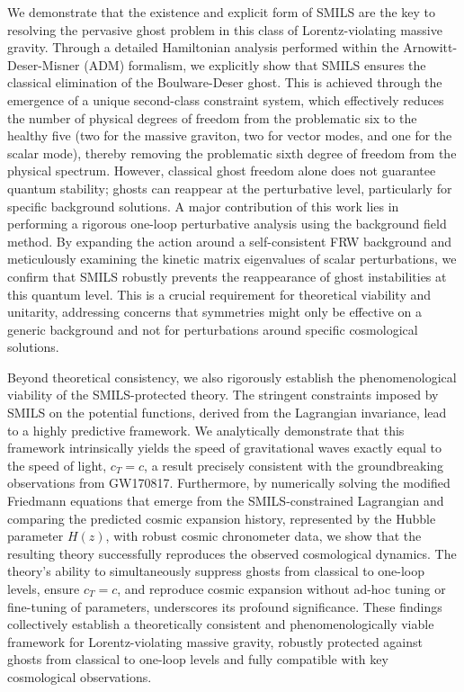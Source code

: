 \documentclass[twocolumn]{aastex631}
\begin{document}
We demonstrate that the existence and explicit form of SMILS are the key to resolving the pervasive ghost problem in this class of Lorentz-violating massive gravity. Through a detailed Hamiltonian analysis performed within the Arnowitt-Deser-Misner (ADM) formalism, we explicitly show that SMILS ensures the classical elimination of the Boulware-Deser ghost. This is achieved through the emergence of a unique second-class constraint system, which effectively reduces the number of physical degrees of freedom from the problematic six to the healthy five (two for the massive graviton, two for vector modes, and one for the scalar mode), thereby removing the problematic sixth degree of freedom from the physical spectrum. However, classical ghost freedom alone does not guarantee quantum stability; ghosts can reappear at the perturbative level, particularly for specific background solutions. A major contribution of this work lies in performing a rigorous one-loop perturbative analysis using the background field method. By expanding the action around a self-consistent FRW background and meticulously examining the kinetic matrix eigenvalues of scalar perturbations, we confirm that SMILS robustly prevents the reappearance of ghost instabilities at this quantum level. This is a crucial requirement for theoretical viability and unitarity, addressing concerns that symmetries might only be effective on a generic background and not for perturbations around specific cosmological solutions.

Beyond theoretical consistency, we also rigorously establish the phenomenological viability of the SMILS-protected theory. The stringent constraints imposed by SMILS on the potential functions, derived from the Lagrangian invariance, lead to a highly predictive framework. We analytically demonstrate that this framework intrinsically yields the speed of gravitational waves exactly equal to the speed of light, $c_T=c$, a result precisely consistent with the groundbreaking observations from GW170817. Furthermore, by numerically solving the modified Friedmann equations that emerge from the SMILS-constrained Lagrangian and comparing the predicted cosmic expansion history, represented by the Hubble parameter $H(z)$, with robust cosmic chronometer data, we show that the resulting theory successfully reproduces the observed cosmological dynamics. The theory's ability to simultaneously suppress ghosts from classical to one-loop levels, ensure $c_T=c$, and reproduce cosmic expansion without ad-hoc tuning or fine-tuning of parameters, underscores its profound significance. These findings collectively establish a theoretically consistent and phenomenologically viable framework for Lorentz-violating massive gravity, robustly protected against ghosts from classical to one-loop levels and fully compatible with key cosmological observations.
\end{document}
